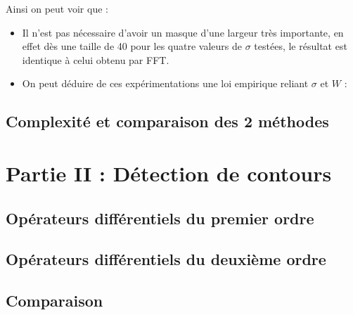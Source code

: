 \documentclass[a4,12pt]{article}
\begin{document}
\noindent
Ainsi on peut voir que :
\begin{itemize}
	\item Il n'est pas nécessaire d'avoir un masque d'une largeur très importante, en effet dès une taille de 40 pour les quatre valeurs de $\sigma$ testées, le résultat est identique à celui obtenu par FFT.
	\item On peut déduire de ces expérimentations une loi empirique reliant $\sigma$ et $W$ :\\
	\begin{center}
	\end{center}
\end{itemize}

\subsection{Complexité et comparaison des 2 méthodes}


\section{Partie II : Détection de contours}

\subsection{Opérateurs différentiels du premier ordre}

\subsection{Opérateurs différentiels du deuxième ordre}

\subsection{Comparaison}


\end{document}
